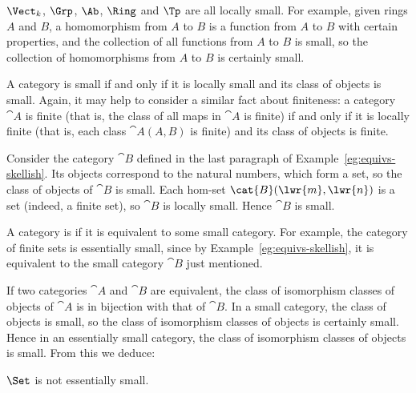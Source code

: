 \begin{example}
%
%
%
%
% 
%
$\Vect_k$, $\Grp$, $\Ab$, $\Ring$ and $\Tp$ are all locally small.  For
example, given rings $A$ and $B$, a homomorphism from $A$ to $B$ is a
function from $A$ to $B$ with certain properties, and the collection of all
functions from $A$ to $B$ is small, so the collection of homomorphisms from
$A$ to $B$ is certainly small.
\end{example}

A category is small if and only if it is locally small and its class of
objects is small.  Again, it may help to consider a similar fact about
finiteness: a category $\cat{A}$ is finite (that is, the class of all maps
in $\cat{A}$ is finite) if and only if it is locally finite (that is, each
class $\cat{A}(A, B)$ is finite) and its class of objects is finite.

\begin{example}	
\label{eg:FinSet-skel}
Consider the category $\cat{B}$ defined in the last paragraph of 
Example~\ref{eg:equivs-skellish}.  Its objects correspond to the natural
numbers, which form a set, so the class of objects of $\cat{B}$ is small.
Each hom-set $\cat{B}(\lwr{m}, \lwr{n})$ is a set (indeed, a finite set),
so $\cat{B}$ is locally small.  Hence $\cat{B}$ is small.
\end{example}

A category is %
%
%
%
if it is equivalent to some small category.  For example, the category of
finite%
%
%
sets is essentially small, since by Example~\ref{eg:equivs-skellish}, it is
equivalent to the small category $\cat{B}$ just mentioned.

If two categories $\cat{A}$ and $\cat{B}$ are equivalent, the class of
isomorphism classes of objects of $\cat{A}$ is in bijection with that of
$\cat{B}$.  In a small category, the class of objects is small, so the
class of isomorphism classes of objects is certainly small.  Hence in an
essentially small category, the class of isomorphism classes of objects is
small.  From this we deduce:

\begin{propn}	
\label{propn:Set-large}
%
$\Set$ is not essentially small.
\end{propn}

